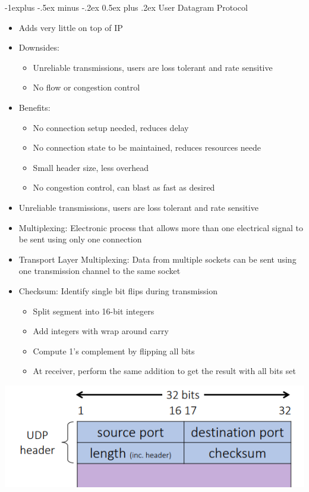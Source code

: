 \documentclass[10pt, landscape]{article}
\makeatletter
\renewcommand{\section}{\@startsection{section}{1}{0mm}%
                                {-1ex plus -.5ex minus -.2ex}%
                                {0.5ex plus .2ex}%
                                {\normalfont\large\bfseries}}
\renewcommand{\section}{\@startsection{section}{2}{0mm}%
                                {-1explus -.5ex minus -.2ex}%
                                {0.5ex plus .2ex}%
                                {\normalfont\normalsize\bfseries}}
\makeatother
\begin{document}
\begin{multicols*}{3}
\section{User Datagram Protocol}
\begin{itemize}
    \item Adds very little on top of IP
    \item Downsides:
    \begin{itemize}
        \item Unreliable transmissions, users are loss tolerant and rate sensitive
        \item No flow or congestion control
    \end{itemize}
    \item Benefits:
    \begin{itemize}
        \item No connection setup needed, reduces delay
        \item No connection state to be maintained, reduces resources neede
        \item Small header size, less overhead
        \item No congestion control, can blast as fast as desired
    \end{itemize}
    \item Unreliable transmissions, users are loss tolerant and rate sensitive
    \item Multiplexing: Electronic process that allows more than one electrical signal to be sent using only one connection
    \item Transport Layer Multiplexing: Data from multiple sockets can be sent using one transmission channel to the same socket
    \item Checksum: Identify single bit flips during transmission
    \begin{itemize}
        \item Split segment into 16-bit integers
        \item Add integers with wrap around carry
        \item Compute 1's complement by flipping all bits
        \item At receiver, perform the same addition to get the result with all bits set
    \end{itemize}
\end{itemize}
\begin{center}
    \includegraphics[width=0.9\linewidth]{UDP.png}
\end{center}


\end{multicols*}
\end{document}

